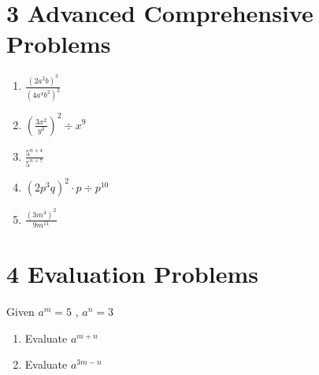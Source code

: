\documentclass[12pt,a4paper,]{article}
\begin{document}
\section{3 Advanced Comprehensive Problems}
\begin{enumerate}
	\item \(\frac{\left(2 a^{2} b\right)^{3}}{\left(4 a^{4} b^{2}\right)^{2}}\)
	\item \(\left(\frac{3 x^{2}}{y^{3}}\right)^{2} ÷ x^{9}\)
	\item \(\frac{5^{n+4}}{5^{n+7}}\)
	\item \(\left(2 p^{3} q\right)^{2} \cdot p ÷ p^{10}\)
	\item \(\frac{\left(3 m^{4}\right)^{2}}{9 m^{11}}\)
\end{enumerate}

\section{4 Evaluation Problems}
Given \(a^{m}=5\) , \(a^{n}=3\)
\begin{enumerate}
	\item Evaluate \(a^{m+n}\)
	\item Evaluate \(a^{3 m-n}\)
\end{enumerate}
\end{document}
